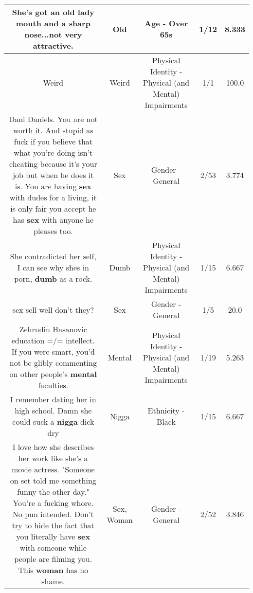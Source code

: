 \documentclass[11pt]{article}
\newlength\mylength
\begin{document}
\begin{center}
\begin{longtable}{|C{.65\mylength}|C{.30\mylength}|C{.12\mylength}|C{.12\mylength}|C{.12\mylength}|}
  \small She's got an \textbf{old} lady mouth and a sharp nose...not very attractive.\normalsize   & Old & Age - Over 65s & 1/12 & 8.333 \\  \hline
  \small Weird\normalsize   & Weird & Physical Identity - Physical (and Mental) Impairments & 1/1 & 100.0 \\  \hline
  \small Dani Daniels. You are not worth it. And stupid as fuck if you believe that what you're doing isn't cheating because it's your job but when he does it is. You are having \textbf{sex} with dudes for a living, it is only fair you accept he has \textbf{sex} with anyone he pleases too.\normalsize   & Sex & Gender - General & 2/53 & 3.774 \\  \hline
  \small She contradicted her self, I can see why shes in porn, \textbf{dumb} as a rock.\normalsize   & Dumb & Physical Identity - Physical (and Mental) Impairments & 1/15 & 6.667 \\  \hline
  \small sex sell well don't they?\normalsize   & Sex & Gender - General & 1/5 & 20.0 \\  \hline
  \small Zehrudin Hasanovic education =/= intellect. If you were smart, you'd not be glibly commenting on other people's \textbf{mental} faculties.\normalsize   & Mental & Physical Identity - Physical (and Mental) Impairments & 1/19 & 5.263 \\  \hline
  \small I remember dating her in high school. Damn she could suck a \textbf{nigga} dick dry\normalsize   & Nigga & Ethnicity - Black & 1/15 & 6.667 \\  \hline
  \small I love how she describes her work like she's a movie actress. "Someone on set told me something funny the other day." You're a fucking whore. No pun intended. Don't try to hide the fact that you literally have \textbf{sex} with someone while people are filming you. This \textbf{woman} has no shame.\normalsize   & Sex, Woman & Gender - General & 2/52 & 3.846 \\  \hline

\end{longtable}
\end{center}
\end{document}
